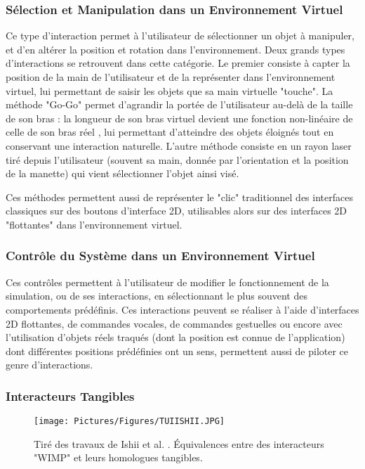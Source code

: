 	\subsubsection{Sélection et Manipulation dans un Environnement Virtuel}
	Ce type d'interaction permet à l'utilisateur de sélectionner un objet à manipuler, et d'en altérer la position et rotation dans l'environnement. Deux grands types d'interactions se retrouvent dans cette catégorie. Le premier consiste à capter la position de la main de l'utilisateur et de la représenter dans l'environnement virtuel, lui permettant de saisir les objets que sa main virtuelle "touche". La méthode "Go-Go" permet d'agrandir la portée de l'utilisateur au-delà de la taille de son bras : la longueur de son bras virtuel devient une fonction non-linéaire de celle de son bras réel \cite{poupyrev_go-go_1996}, lui permettant d'atteindre des objets éloignés tout en conservant une interaction naturelle. L'autre méthode consiste en un rayon laser tiré depuis l'utilisateur (souvent sa main, donnée par l'orientation et la position de la manette) qui vient sélectionner l'objet ainsi visé. 
	
	Ces méthodes permettent aussi de représenter le "clic" traditionnel des interfaces classiques sur des boutons d'interface 2D, utilisables alors sur des interfaces 2D "flottantes" dans l'environnement virtuel.
	
	\subsubsection{Contrôle du Système dans un Environnement Virtuel}
	Ces contrôles permettent à l'utilisateur de modifier le fonctionnement de la simulation, ou de ses interactions, en sélectionnant le plus souvent des comportements prédéfinis. Ces interactions peuvent se réaliser à l'aide d'interfaces 2D flottantes, de commandes vocales, de commandes gestuelles ou encore avec l'utilisation d'objets réels traqués (dont la position est connue de l'application) dont différentes positions prédéfinies ont un sens, permettent aussi de piloter ce genre d'interactions.
	
	
	\subsubsection{Interacteurs Tangibles}
	
		\begin{figure}
			\centering
			\texttt{[image: Pictures/Figures/TUIISHII.JPG]}
			\caption{Tiré des travaux de Ishii et al. \cite{ishii_tangible_1997}. Équivalences entre des interacteurs "WIMP" et leurs homologues tangibles.}
			\label{TUIEx}
		\end{figure}	
	
